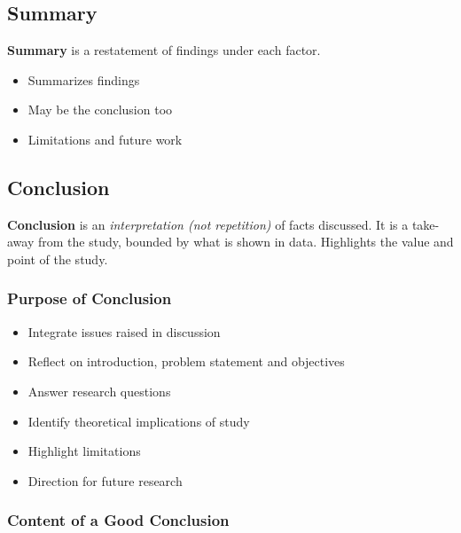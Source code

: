 \documentclass{article}
\begin{document}
\subsection{Summary}

\textbf{Summary} is a restatement of findings under each factor.

\begin{itemize}
    \item Summarizes findings
    \item May be the conclusion too
    \item Limitations and future work
\end{itemize}

\subsection{Conclusion}

\textbf{Conclusion} is an \textit{interpretation (not repetition)} of facts discussed. It is a take-away from the study, bounded by what is shown in data. Highlights the value and point of the study.

\subsubsection{Purpose of Conclusion}

\begin{itemize}
    \item Integrate issues raised in discussion
    \item Reflect on introduction, problem statement and objectives
    \item Answer research questions
    \item Identify theoretical implications of study
    \item Highlight limitations
    \item Direction for future research
\end{itemize}

\subsubsection{Content of a Good Conclusion}
\end{document}
